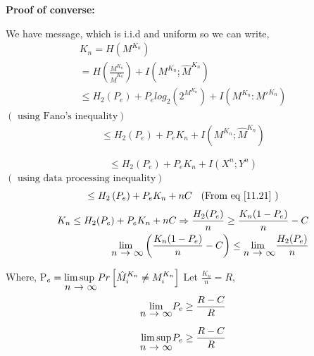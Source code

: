 \documentclass{article}
\begin{document}
\textbf{Proof of converse:}


We have message, which is i.i.d and uniform so we can write,
\begin{gather}
	K_n = H \left( M^{K_n}\right)\\
	= H\left( \frac{M^{K_n}}{\hat{M}^{K_n}}\right) + I\left( M^{K_n} ; \hat{M}^{K_n}\right)\\
   \leq H_{2}(P_{e}) + P_{e}log_{2}(2^{M^{K_{n}}}) + I(M^{K_{n}}:{M'}^{K_{n}})
\end{gather}
\hspace{10cm} $\left(\text{ using Fano's inequality} \right)$
\begin{gather}
	\leq H_{2}\left( P_e\right) + P_{e}K_{n} + I\left( M^{K_n} ; \hat{M}^{K_n}\right)
\end{gather}

\begin{equation}
	\leq H_{2}\left( P_e\right) + P_{e}K_{n} + I\left( X^n ; Y^n\right)
\end{equation}
\hspace{10cm} $\left(\text{ using data processing inequality} \right)$
\begin{equation}
	\leq H_{2}\left( P_e\right) + P_{e}K_{n} + nC  \hspace{2mm}\text{ (From eq \ref{11.21} )}
\end{equation}
\begin{eqnarray*}
	  	K_{n}  \leq H_{2}(P_{e}) + P_{e}K_{n} + nC  \Rightarrow \frac{H_{2}(P_{e})}{n} \geq \frac{K_{n}(1 - P_{e})}{n} - C \\
	 	\stackunder{$\lim$ }{$n$ $\rightarrow$ $\infty$} \left(  \frac{K_{n}(1 - P_{e})}{n} - C \right) \leq  \stackunder{$\lim$ }{$n$ $\rightarrow$ $\infty$} \frac{H_{2}(P_{e})}{n}  
	 \end{eqnarray*} 

Where, P$_{e} = \stackunder{$\limsup$ }{$n$ $\rightarrow$ $\infty$} Pr \left[ \hat{M}_{i}^{K_n} \neq M_{i}^{K_n}\right]$ \newpage
Let $\frac{K_{n}}{n} = R $, \\
 
\begin{align}
\stackunder{$\lim$}{$n$ $\rightarrow$ $\infty$} P_{e} \geq \frac{R - C}{R} 
\end{align}
 
 \begin{align}
 	\stackunder{$\limsup$}{$n$ $\rightarrow$ $\infty$} P_{e} \geq \frac{R - C}{R} \label{2.15}
 \end{align} 
  
\end{document}

